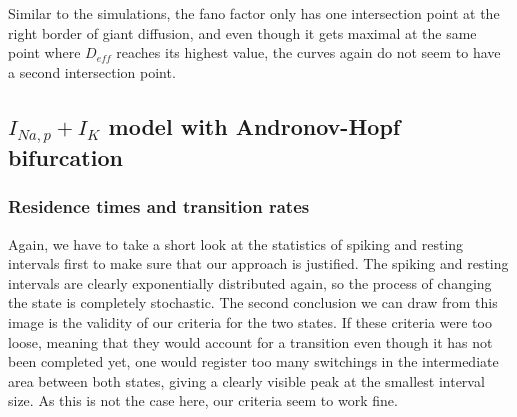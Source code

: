 \documentclass[12pt,a4paper]{article}
\begin{document}
Similar to the simulations, the fano factor only has one intersection point at the right border of giant diffusion, and even though it gets maximal at the same point where $D_{eff}$ reaches its highest value, the curves again do not seem to have a second intersection point.
\subsection{$I_{Na,p}+I_K$ model with Andronov-Hopf bifurcation}
\subsubsection{Residence times and transition rates}
Again, we have to take a short look at the statistics of spiking and resting intervals first to make sure that our approach is justified. The spiking and resting intervals are clearly exponentially distributed again, so the process of changing the state is completely stochastic. The second conclusion we can draw from this image is the validity of our criteria for the two states. If these criteria were too loose, meaning that they would account for a transition even though it has not been completed yet, one would register too many switchings in the intermediate area between both states, giving a clearly visible peak at the smallest interval size. As this is not the case here, our criteria seem to work fine.
\end{document}
